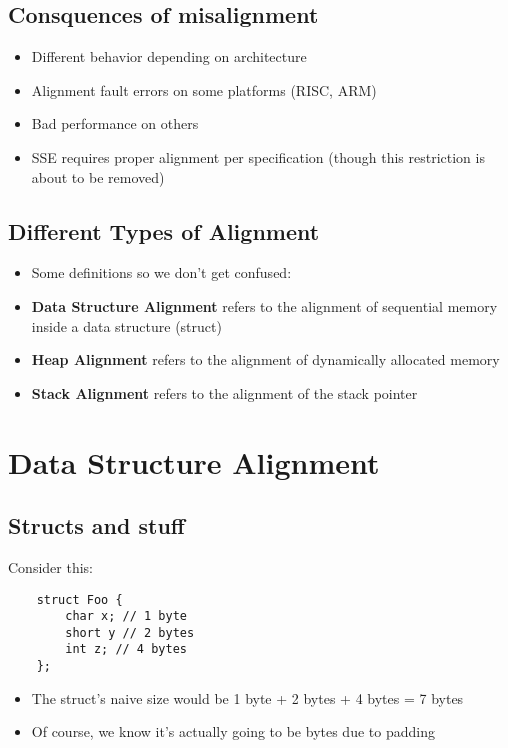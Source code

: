 \documentclass{beamer}
\begin{document}
\subsection{Consquences of misalignment}
\begin{frame}{\insertsection}{\insertsubsection}
	\begin{itemize}
		\item Different behavior depending on architecture
		\item Alignment fault errors on some platforms (RISC, ARM)
		\item Bad performance on others
		\item SSE requires proper alignment per specification (though this restriction is about to be removed)
	\end{itemize}
\end{frame}

\subsection{Different Types of Alignment}
\begin{frame}{\insertsection}{\insertsubsection}
	\begin{itemize}
		\item Some definitions so we don't get confused:\pause
        \item \textbf{Data Structure Alignment} refers to the alignment of sequential memory inside
            a data structure (struct) \pause
        \item \textbf{Heap Alignment} refers to the alignment of dynamically allocated memory\pause
        \item \textbf{Stack Alignment} refers to the alignment of the stack pointer
	\end{itemize}
\end{frame}

\section{Data Structure Alignment}
\subsection{Structs and stuff}
\begin{frame}[fragile]{\insertsection}{\insertsubsection}
    \pause
    Consider this:
    \begin{verbatim}
    struct Foo {
        char x; // 1 byte
        short y // 2 bytes
        int z; // 4 bytes
    };
    \end{verbatim}
    \begin{itemize}
        \item The struct's naive size would be 1 byte + 2 bytes + 4 bytes = 7 bytes\pause
        \item Of course, we know it's actually going to be  bytes due to padding
    \end{itemize}
\end{frame}
\end{document}
